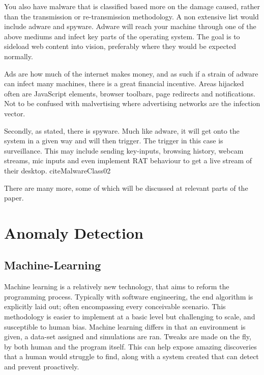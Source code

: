 You also have malware that is classified based more on the damage caused, rather than the transmission or re-transmission methodology. A non extensive list would include adware and spyware. Adware will reach your machine through one of the above mediums
and infect key parts of the operating system. The goal is to sideload web content into vision, preferably where they would be expected normally. 

Ads are how much of the internet makes money, and as such if a strain of adware can infect many machines, there is a great financial incentive.
Areas hijacked often are JavaScript elements, browser toolbars, page redirects and notifications. Not to be confused with malvertising where advertising networks are the infection vector. \citep{MalwareClass} 

Secondly, as stated, there is spyware. Much like adware, it will get onto the system in a given way and will then trigger. The trigger in this case is surveillance. This may include sending
key-inputs, browsing history, webcam streams, mic inputs and even implement RAT behaviour to get a live stream of their desktop. cite{MalwareClass02}  \citep{MalwareClass} 



There are many more, some of which will be discussed at relevant parts of the paper.


\section{Anomaly Detection}
\subsection{Machine-Learning}
Machine learning is a relatively new technology, that aims to reform the programming process. Typically with software engineering, the end algorithm is explicitly laid out; often encompassing every conceivable scenario.
This methodology is easier to implement at a basic level but challenging to scale, and susceptible to human bias. Machine learning differs in that an environment is given, a data-set assigned and simulations are ran. 
Tweaks are made on the fly, by both human and the program itself. This can help expose amazing discoveries that a human would struggle to find, along with a system created that can detect and prevent proactively.

